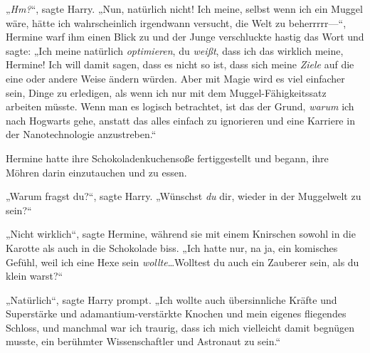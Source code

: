 „\emph{Hm?}“, sagte Harry. „Nun, natürlich nicht! Ich meine, selbst wenn ich ein Muggel wäre, hätte ich wahrscheinlich irgendwann versucht, die Welt zu beherrrrr—“, Hermine warf ihm einen Blick zu und der Junge verschluckte hastig das Wort und sagte: „Ich meine natürlich \emph{optimieren}, du \emph{weißt}, dass ich das wirklich meine, Hermine! Ich will damit sagen, dass es nicht so ist, dass sich meine \emph{Ziele} auf die eine oder andere Weise ändern würden. Aber mit Magie wird es viel einfacher sein, Dinge zu erledigen, als wenn ich nur mit dem Muggel-Fähigkeitssatz arbeiten müsste. Wenn man es logisch betrachtet, ist das der Grund, \emph{warum} ich nach Hogwarts gehe, anstatt das alles einfach zu ignorieren und eine Karriere in der Nanotechnologie anzustreben.“

Hermine hatte ihre Schokoladenkuchensoße fertiggestellt und begann, ihre Möhren darin einzutauchen und zu essen.

„Warum fragst du?“, sagte Harry. „Wünschst \emph{du} dir, wieder in der Muggelwelt zu sein?“

„Nicht wirklich“, sagte Hermine, während sie mit einem Knirschen sowohl in die Karotte als auch in die Schokolade biss. „Ich hatte nur, na ja, ein komisches Gefühl, weil ich eine Hexe sein \emph{wollte}…Wolltest du auch ein Zauberer sein, als du klein warst?“

„Natürlich“, sagte Harry prompt. „Ich wollte auch übersinnliche Kräfte und Superstärke und adamantium-verstärkte Knochen und mein eigenes fliegendes Schloss, und manchmal war ich traurig, dass ich mich vielleicht damit begnügen musste, ein berühmter Wissenschaftler und Astronaut zu sein.“

